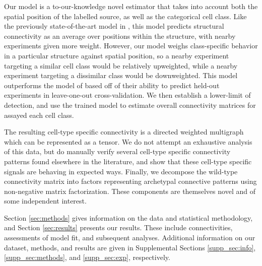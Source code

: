 Our model is a to-our-knowledge novel estimator that takes into account both the spatial position of the labelled source, as well as the categorical cell class.
Like the previously state-of-the-art model in \citet{Knox2019-ot}, this model predicts structural connectivity as an average over positions within the structure, with nearby experiments given more weight.
However, our model weighs class-specific behavior in a particular structure against spatial position, so a nearby experiment targeting a similar cell class would be relatively upweighted, while a nearby experiment targeting a dissimilar class would be downweighted.
This model outperforms the model of  \citet{Knox2019-ot} based off of their ability to predict held-out experiments in leave-one-out cross-validation.
We then establish a lower-limit of detection, and use the trained model to estimate overall connectivity matrices for assayed each cell class.

The resulting cell-type specific connectivity is a directed weighted multigraph which can be represented as a  tensor.
We do not attempt an exhaustive analysis of this data, but do manually verify several cell-type specific connectivity patterns found elsewhere in the literature, and show that these cell-type specific signals are behaving in expected ways.
Finally, we decompose the wild-type connectivity matrix into factors representing archetypal connective patterns using non-negative matrix factorization.
These components are themselves novel and of some independent interest.

Section \ref{sec:methods} gives information on the data and statistical methodology, and Section \ref{sec:results} presents our results.
These include connectivities, assessments of model fit, and subsequent analyses.
Additional information on our dataset, methods, and results are given in Supplemental Sections \ref{supp_sec:info}, \ref{supp_sec:methods}, and \ref{supp_sec:exp}, respectively.
